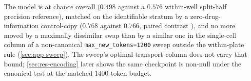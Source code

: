 \begin{claim}
The model is at chance overall ($0.498$ against a $0.576$ within-well split-half
precision reference), matched on the identifiable stratum by a
zero-drug-information control-copy ($0.768$ against $0.766$, paired contrast
), and no more moved by a maximally dissimilar swap
than by a similar one in the single-cell column of a non-canonical
\texttt{max\_new\_tokens=1200} sweep outside the within-plate rule
(\cref{sec:app-sweep}). The sweep's optimal-transport column does not carry that
bound; \cref{sec:res-encoding} later shows the same checkpoint is non-null under
the canonical test at the matched $1400$-token budget.
\end{claim}
